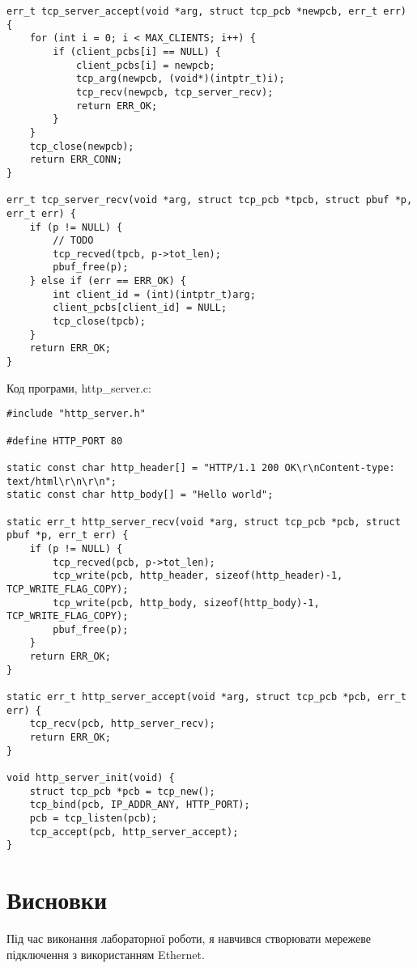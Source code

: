 \documentclass[oneside,14pt]{extarticle}
\begin{document}
\begin{normalsize}
{\begin{lstlisting}
err_t tcp_server_accept(void *arg, struct tcp_pcb *newpcb, err_t err) {
    for (int i = 0; i < MAX_CLIENTS; i++) {
        if (client_pcbs[i] == NULL) {
            client_pcbs[i] = newpcb;
            tcp_arg(newpcb, (void*)(intptr_t)i);
            tcp_recv(newpcb, tcp_server_recv);
            return ERR_OK;
        }
    }
    tcp_close(newpcb);
    return ERR_CONN;
}

err_t tcp_server_recv(void *arg, struct tcp_pcb *tpcb, struct pbuf *p, err_t err) {
    if (p != NULL) {
    	// TODO
        tcp_recved(tpcb, p->tot_len);
        pbuf_free(p);
    } else if (err == ERR_OK) {
        int client_id = (int)(intptr_t)arg;
        client_pcbs[client_id] = NULL;
        tcp_close(tpcb);
    }
    return ERR_OK;
}\end{lstlisting}}

Код програми, http\_server.c:
  
{\small\begin{lstlisting}
#include "http_server.h"

#define HTTP_PORT 80

static const char http_header[] = "HTTP/1.1 200 OK\r\nContent-type: text/html\r\n\r\n";
static const char http_body[] = "Hello world";

static err_t http_server_recv(void *arg, struct tcp_pcb *pcb, struct pbuf *p, err_t err) {
    if (p != NULL) {
        tcp_recved(pcb, p->tot_len);
        tcp_write(pcb, http_header, sizeof(http_header)-1, TCP_WRITE_FLAG_COPY);
        tcp_write(pcb, http_body, sizeof(http_body)-1, TCP_WRITE_FLAG_COPY);
        pbuf_free(p);
    }
    return ERR_OK;
}

static err_t http_server_accept(void *arg, struct tcp_pcb *pcb, err_t err) {
    tcp_recv(pcb, http_server_recv);
    return ERR_OK;
}

void http_server_init(void) {
    struct tcp_pcb *pcb = tcp_new();
    tcp_bind(pcb, IP_ADDR_ANY, HTTP_PORT);
    pcb = tcp_listen(pcb);
    tcp_accept(pcb, http_server_accept);
}\end{lstlisting}}
	
	\section*{Висновки}
	Під час виконання лабораторної роботи, я навчився створювати мережеве підключення з використанням Ethernet.
	    
\end{normalsize}
\end{document}
